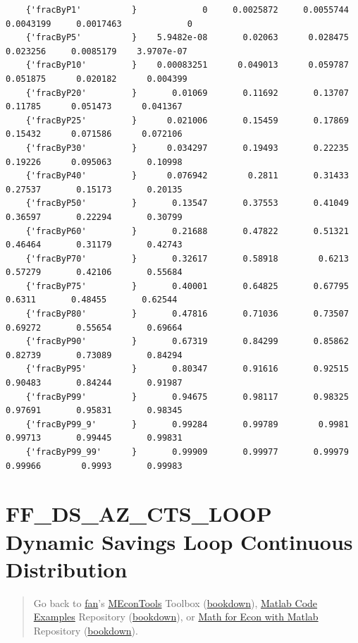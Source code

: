 \documentclass[
]{book}
\begin{document}
\begin{verbatim}
    {'fracByP1'          }             0     0.0025872     0.0055744     0.0043199     0.0017463             0 
    {'fracByP5'          }    5.9482e-08       0.02063      0.028475      0.023256     0.0085179    3.9707e-07 
    {'fracByP10'         }    0.00083251      0.049013      0.059787      0.051875      0.020182      0.004399 
    {'fracByP20'         }       0.01069       0.11692       0.13707       0.11785      0.051473      0.041367 
    {'fracByP25'         }      0.021006       0.15459       0.17869       0.15432      0.071586      0.072106 
    {'fracByP30'         }      0.034297       0.19493       0.22235       0.19226      0.095063       0.10998 
    {'fracByP40'         }      0.076942        0.2811       0.31433       0.27537       0.15173       0.20135 
    {'fracByP50'         }       0.13547       0.37553       0.41049       0.36597       0.22294       0.30799 
    {'fracByP60'         }       0.21688       0.47822       0.51321       0.46464       0.31179       0.42743 
    {'fracByP70'         }       0.32617       0.58918        0.6213       0.57279       0.42106       0.55684 
    {'fracByP75'         }       0.40001       0.64825       0.67795        0.6311       0.48455       0.62544 
    {'fracByP80'         }       0.47816       0.71036       0.73507       0.69272       0.55654       0.69664 
    {'fracByP90'         }       0.67319       0.84299       0.85862       0.82739       0.73089       0.84294 
    {'fracByP95'         }       0.80347       0.91616       0.92515       0.90483       0.84244       0.91987 
    {'fracByP99'         }       0.94675       0.98117       0.98325       0.97691       0.95831       0.98345 
    {'fracByP99_9'       }       0.99284       0.99789        0.9981       0.99713       0.99445       0.99831 
    {'fracByP99_99'      }       0.99909       0.99977       0.99979       0.99966        0.9993       0.99983 
\end{verbatim}

\hypertarget{ff_ds_az_cts_loop-dynamic-savings-loop-continuous-distribution}{%
\section{FF\_DS\_AZ\_CTS\_LOOP Dynamic Savings Loop Continuous Distribution}\label{ff_ds_az_cts_loop-dynamic-savings-loop-continuous-distribution}}

\begin{quote}
Go back to \href{http://fanwangecon.github.io/}{fan}'s \href{https://fanwangecon.github.io/MEconTools/}{MEconTools} Toolbox (\href{https://fanwangecon.github.io/MEconTools/bookdown}{bookdown}), \href{https://fanwangecon.github.io/M4Econ/}{Matlab Code Examples} Repository (\href{https://fanwangecon.github.io/M4Econ/bookdown}{bookdown}), or \href{https://fanwangecon.github.io/Math4Econ/}{Math for Econ with Matlab} Repository (\href{https://fanwangecon.github.io/Math4Econ/bookdown}{bookdown}).
\end{quote}
\end{document}

